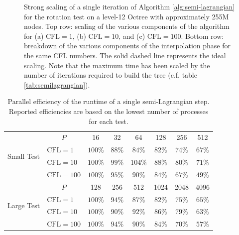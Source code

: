 \begin{figure}[htbp]
\begin{center}
	\end{center}
	\caption{Strong scaling of a single iteration of Algorithm \ref{alg:semi-lagrangian} for the rotation test on a level-12 Octree with approximately 255M nodes. Top row: scaling of the various components of the algorithm for (a) $\text{CFL} = 1$, (b) $\text{CFL} = 10$, and (c) $\text{CFL} = 100$. Bottom row: breakdown of the various components of the interpolation phase for the same CFL numbers. The solid dashed line represents the ideal scaling. Note that the maximum time has been scaled by the number of iterations required to build the tree (c.f. table \ref{tab:semilagrangian}).}
	\label{fig:semilagrangian_large}
\end{figure}

\begin{table}
\centering
	\begin{tabular}{|l|l|cccccc|}
	\hline
	\multirow{4}{*}{Small Test} & \multicolumn{1}{|c|}{$P$} & 16      & 32      & 64      & 128     & 256    & 512 \\
	\cline{2-8} 	                            
	                            & $\text{CFL} = 1$   & $100\%$ & $88\%$  & $84\%$  & $82\%$  & $74\%$ & $67\%$ \\
	                            & $\text{CFL} = 10$  & $100\%$ & $99\%$  & $104\%$ & $88\%$  & $80\%$ & $71\%$ \\ 	                            
	                            & $\text{CFL} = 100$ & $100\%$ & $95\%$  & $90\%$  & $84\%$  & $67\%$ & $49\%$ \\
	\hline
	\multirow{4}{*}{Large Test} & \multicolumn{1}{|c|}{$P$} & 128     & 256     & 512     & 1024    & 2048   & 4096 \\
	\cline{2-8} 	                            
	                            & $\text{CFL} = 1$   & $100\%$ & $94\%$  & $87\%$  & $82\%$  & $75\%$ & $65\%$ \\
	                            & $\text{CFL} = 10$  & $100\%$ & $90\%$  & $92\%$  & $86\%$  & $79\%$ & $63\%$ \\
	                            & $\text{CFL} = 100$ & $100\%$ & $94\%$  & $90\%$  & $84\%$  & $70\%$ & $57\%$ \\
	\hline
	\end{tabular}
	\caption{Parallel efficiency of the runtime of a single semi-Lagrangian step. Reported efficiencies are based on the lowest number of processes for each test.}
	\label{tab:scaling_semilagrangian}
\end{table}

